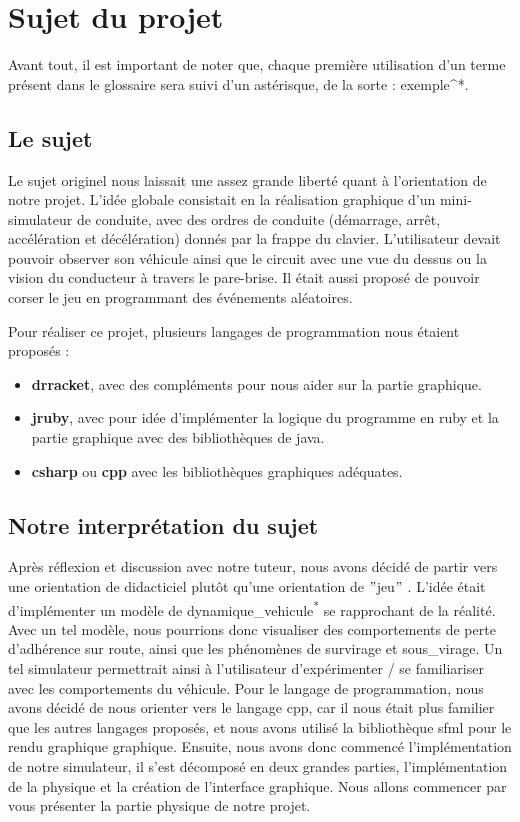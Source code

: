 \usepackage{glossaries}\section{Sujet du projet}\label{sec:sujet-du-projet}
Avant tout, il est important de noter que, chaque première utilisation d'un terme présent dans le glossaire sera suivi d'un astérisque, de la sorte : exemple^{*}.
\subsection{Le sujet}\label{subsec:le-sujet}
Le sujet originel nous laissait une assez grande liberté quant à l'orientation de notre projet.
L'idée globale consistait en la réalisation graphique d'un mini-simulateur de conduite, avec des ordres de conduite (démarrage, arrêt, accélération et décélération) donnés par la frappe du clavier.
L'utilisateur devait pouvoir observer son véhicule ainsi que le circuit avec une vue du dessus ou la vision du conducteur à travers le pare-brise.
Il était aussi proposé de pouvoir \og corser\fg{} le jeu en programmant des événements aléatoires.

Pour réaliser ce projet, plusieurs langages de programmation nous étaient proposés :
\begin{itemize}
    \item \textbf{\gls{drracket}}, avec des compléments pour nous aider sur la partie graphique.
    \item \textbf{\gls{jruby}}, avec pour idée d'implémenter la logique du programme en \gls{ruby} et la partie graphique avec des bibliothèques de \gls{java}.
    \item \textbf{\gls{csharp}} ou \textbf{\gls{cpp}} avec les bibliothèques graphiques adéquates.
\end{itemize}


\subsection{Notre interprétation du sujet}\label{subsec:notre-interpretation-du-sujet-/-objectif-du-sujet}
Après réflexion et discussion avec notre tuteur, nous avons décidé de partir vers une orientation de didacticiel plutôt qu'une \og orientation de \("\)jeu\("\) \fg{}.
L'idée était d'implémenter un modèle de \gls{dynamique_vehicule}\textsuperscript{*} se rapprochant de la réalité.
Avec un tel modèle, nous pourrions donc visualiser des comportements de perte d'adhérence sur route, ainsi que les phénomènes de \gls{survirage} et \gls{sous_virage}.
Un tel simulateur permettrait ainsi à l'utilisateur d'expérimenter / se familiariser avec les comportements du véhicule.
Pour le langage de programmation, nous avons décidé de nous orienter vers le langage \gls{cpp}, car il nous était plus familier que les autres langages proposés, et nous avons utilisé la bibliothèque \og \gls{sfml} \fg{} pour le rendu graphique graphique.
Ensuite, nous avons donc commencé l'implémentation de notre simulateur, il s'est décomposé en deux grandes parties, l'implémentation de la physique et la création de l'interface graphique.
Nous allons commencer par vous présenter la partie physique de notre projet.

\newpage